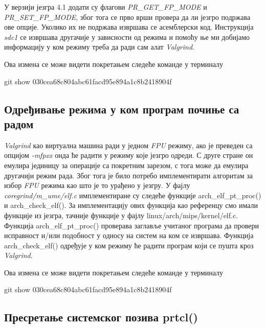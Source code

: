 \documentclass[12pt,oneside]{memoir}
\begin{document}
\indent У верзији језгра 4.1 додати су флагови  \textit{PR\_GET\_FP\_MODE} и \textit{PR\_SET\_FP\_MODE}, због тога се прво врши провера да ли језгро подржава ове опције. Уколико их не подржава извршава се асемблерски код. Инструкција \textit{sdc1} се извршава другачије у зависности од режима и помоћу ње ми добијамо информацију у ком режиму треба да ради сам алат \textit{Valgrind}.

Ова измена се може видети покретањем следеће команде у терминалу

\begin{center}
git show 030cea68c804abc61facd95e894a1c8b2418904f
\end{center}

\subsection{Одређивање режима у ком програм почиње са радом}


\indent \textit{Valgrind} као виртуална машина ради у једном \textit{FPU} режиму, ако је преведен са опцијом  \textit{-mfpxx} онда ће радити у режиму које језгро одреди. С друге стране он емулира јединицу за операције са покретним зарезом, с тога може да емулира другачији режим рада. Због тога је било потребо имплементирати алгоритам за избор \textit{FPU} режима као што је то урађено у језгру. У фајлу \textit{coregrind/m\_ume/elf.c} имплементиране су следеће функције arch\_elf\_pt\_proc() и arch\_check\_elf(). За имплементацију ових функција као референцу смо имали функције из језгра, тачније функције у фајлу 
linux/arch/mips/kernel/elf.c. Функција arch\_elf\_pt\_proc() проверава заглавље учитаног програма да провери исправност и/или подобност у односу на систем на ком се извршава. Функција arch\_check\_elf() одређује у ком режиму ће радити програм који се пушта кроз \textit{Valgrind}.

Ова измена се може видети покретањем следеће команде у терминалу

\begin{center}
git show 030cea68c804abc61facd95e894a1c8b2418904f
\end{center}

\subsection{Пресретање системског позива prtcl()}
\end{document}
